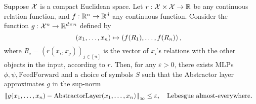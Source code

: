 \begin{theorem}
    Suppose ${\mathcal{X}}$ is a compact Euclidean space. Let $r: {\mathcal{X}} \times {\mathcal{X}} \to \mathbb{R}$ be any continuous relation function, and $f: \mathbb{R}^n \to \mathbb{R}^d$ any continuous function. Consider the function $g: {\mathcal{X}}^n \to \mathbb{R}^{d \times n}$ defined by
    \begin{equation*}
        (x_1, \ldots, x_n) \mapsto \left(f(R_1), \ldots, f(R_n)\right),
    \end{equation*}
    where $R_i = {(r(x_i, x_j))}_{j \in [n]}$ is the vector of $x_i$'s relations with the other objects in the input, according to $r$. Then, for any $\varepsilon > 0$, there exists MLPs $\phi, \psi, \mathrm{FeedForward}$ and a choice of symbols $S$ such that the Abstractor layer approximates $g$ in the sup-norm
    \begin{equation*}
        \left\lVert g(x_1, \ldots, x_n) - \mathrm{AbstractorLayer}(x_1, \ldots, x_n)\right\rVert_{\infty} \leq \varepsilon, \quad \text{Lebesgue almost-everywhere.}
    \end{equation*}
\end{theorem}
